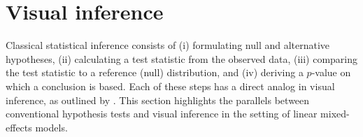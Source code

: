 \documentclass[12pt]{article}
\begin{document}




\section{Visual inference}\label{sec:vi}

Classical statistical inference consists of 
(i) formulating  null and alternative hypotheses,
	(ii) calculating a test statistic from the observed data,
	(iii) comparing the test statistic to a reference (null) distribution,
	and (iv) deriving a $p$-value on which a conclusion is based.
Each of these steps has a direct analog in visual inference, as outlined by \cite{Buja:2009hp}. 
This section highlights the  parallels between conventional hypothesis tests and visual inference in the setting of linear mixed-effects models.
\end{document}
